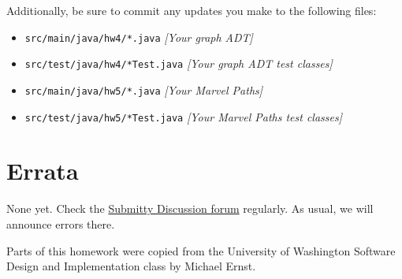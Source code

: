 \documentclass[11pt]{article}
\begin{document}
\noindent Additionally, be sure to commit any updates you make to the following files:
\begin{itemize}
\item \texttt{src/main/java/hw4/*.java} \textit{[Your graph ADT]}
\item \texttt{src/test/java/hw4/*Test.java} \textit{[Your graph ADT test classes]}
\item \texttt{src/main/java/hw5/*.java} \textit{[Your Marvel Paths]}
\item \texttt{src/test/java/hw5/*Test.java} \textit{[Your Marvel Paths test classes]}
\end{itemize}

\section*{Errata}
None yet. Check the \href{https://submitty.cs.rpi.edu/courses/s23/csci2600/forum}{Submitty Discussion forum} regularly. As usual, we will announce errors there.

\noindent
Parts of this homework were copied from the University of Washington Software Design and Implementation class by Michael Ernst.
\end{document}
